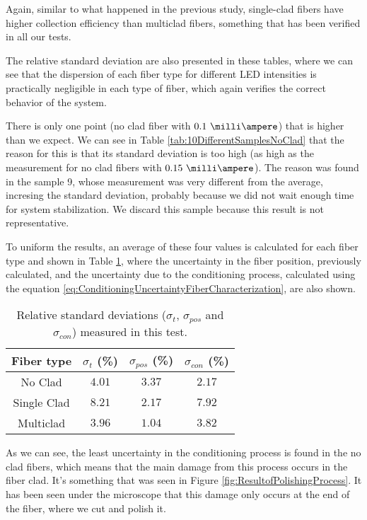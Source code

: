 Again, similar to what happened in the previous study, single-clad fibers have higher collection efficiency than multiclad fibers, something that has been verified in all our tests.

The relative standard deviation are also presented in these tables, where we can see that the dispersion of each fiber type for different LED intensities is practically negligible in each type of fiber, which again verifies the correct behavior of the system. 

There is only one point (no clad fiber with $0.1~\milli\ampere $) that is higher than we expect. We can see in Table \ref{tab:10DifferentSamplesNoClad} that the reason for this is that its standard deviation is too high (as high as the measurement for no clad fibers with $0.15~\milli\ampere$). The reason was found in the sample 9, whose measurement was very different from the average, incresing the standard deviation, probably because we did not wait enough time for system stabilization. We discard this sample because this result is not representative.

To uniform the results, an average of these four values is calculated for each fiber type and shown in Table \ref{tab:RelativeStandardDeviations}, where the uncertainty in the fiber position, previously calculated, and the uncertainty due to the conditioning process, calculated using the equation \ref{eq:ConditioningUncertaintyFiberCharacterization}, are also shown. 

\begin{table}[htbp]
\begin{center}
\begin{tabular}{|c|c|c|c|}
\hline
Fiber type & $\sigma_t$ (\%) & $\sigma_{pos}$ (\%) & $\sigma_{con}$ (\%)\\\hline \hline \hline
No Clad & $4.01$ & $3.37$ & $2.17$ \\ \hline
Single Clad & $8.21$ & $2.17$ & $7.92$ \\ \hline
Multiclad & $3.96$ & $1.04$ & $3.82$ \\ \hline
\end{tabular}
\caption{Relative standard deviations ($\sigma_t$, $\sigma_{pos}$ and $\sigma_{con}$) measured in this test.}
\label{tab:RelativeStandardDeviations}
\end{center}
\end{table}

As we can see, the least uncertainty in the conditioning process is found in the no clad fibers, which means that the main damage from this process occurs in the fiber clad. It's something that was seen in Figure \ref{fig:ResultofPolishingProcess}. It has been seen under the microscope that this damage only occurs at the end of the fiber, where we cut and polish it.

